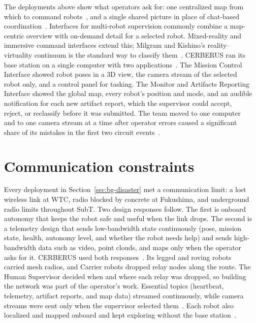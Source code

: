 The deployments above show what operators ask for: one centralized map from which to command robots~\citep{ackerman2021subtoperators}, and a single shared picture in place of chat-based coordination~\citep{murphy2021surfside}.
Interfaces for multi-robot supervision commonly combine a map-centric overview with on-demand detail for a selected robot.
Mixed-reality and immersive command interfaces extend this; Milgram and Kishino's reality--virtuality continuum is the standard way to classify them~\citep{milgram1994continuum}.
CERBERUS ran its base station on a single computer with two applications~\citep{tranzatto2022finals}.
The Mission Control Interface showed robot poses in a 3D view, the camera stream of the selected robot only, and a control panel for tasking.
The Monitor and Artifacts Reporting Interface showed the global map, every robot's position and mode, and an audible notification for each new artifact report, which the supervisor could accept, reject, or reclassify before it was submitted.
The team moved to one computer and to one camera stream at a time after operator errors caused a significant share of its mistakes in the first two circuit events~\citep{tranzatto2022finals}.

\section{Communication constraints}
\label{sec:bg-comms}

Every deployment in Section~\ref{sec:bg-disaster} met a communication limit: a lost wireless link at WTC, radio blocked by concrete at Fukushima, and underground radio limits throughout SubT.
Two design responses follow.
The first is onboard autonomy that keeps the robot safe and useful when the link drops.
The second is a telemetry design that sends low-bandwidth state continuously (pose, mission state, health, autonomy level, and whether the robot needs help) and sends high-bandwidth data such as video, point clouds, and maps only when the operator asks for it.
CERBERUS used both responses~\citep{tranzatto2022tunnelurban,tranzatto2022finals}.
Its legged and roving robots carried mesh radios, and Carrier robots dropped relay nodes along the route.
The Human Supervisor decided when and where each relay was dropped, so building the network was part of the operator's work.
Essential topics (heartbeat, telemetry, artifact reports, and map data) streamed continuously, while camera streams were sent only when the supervisor selected them~\citep{tranzatto2022finals}.
Each robot also localized and mapped onboard and kept exploring without the base station~\citep{kulkarni2022teamed,khattak2025compslam}.

